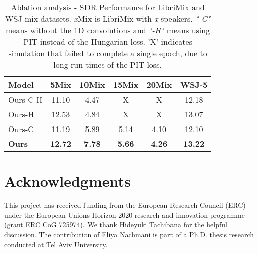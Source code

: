 \documentclass[a4paper]{article}
\begin{document}
\begin{table}[]
\caption{Ablation analysis - SDR Performance for LibriMix and WSJ-mix datasets. \textit{x}Mix is LibriMix with \textit{x} speakers. \textit{"-C"} means without the 1D convolutions and \textit{"-H"} means using PIT instead of the Hungarian loss. 'X' indicates simulation that failed to complete a single epoch, due to long run times of the PIT loss.}
\label{tab:ablation}
\begin{tabular}{lcccc|c}
\toprule
\textbf{Model}                                    & \textbf{5Mix} & \textbf{10Mix} & \textbf{15Mix} & \textbf{20Mix} & \textbf{WSJ-5} \\
\midrule
Ours-C-H & 11.10               & 4.47                & X                & X     & 12.18 \\
Ours-H       & 12.53               & 4.84                & X                & X    & 13.07  \\
Ours-C           & 11.19              & 5.89                & 5.14                & 4.10     & 12.10    \\
\textbf{Ours}        & \textbf{12.72}     & \textbf{7.78}       & \textbf{5.66}       & \textbf{4.26}       & \textbf{13.22}  \\  
\bottomrule
\end{tabular}
\end{table}

\section{Acknowledgments}
 This project has received funding from the European Research Council (ERC) under the European Unions Horizon 2020 research and innovation programme (grant ERC CoG 725974). We thank Hideyuki Tachibana for the helpful discussion. The contribution of Eliya Nachmani is part of a Ph.D. thesis research conducted at Tel Aviv University.



\end{document}
